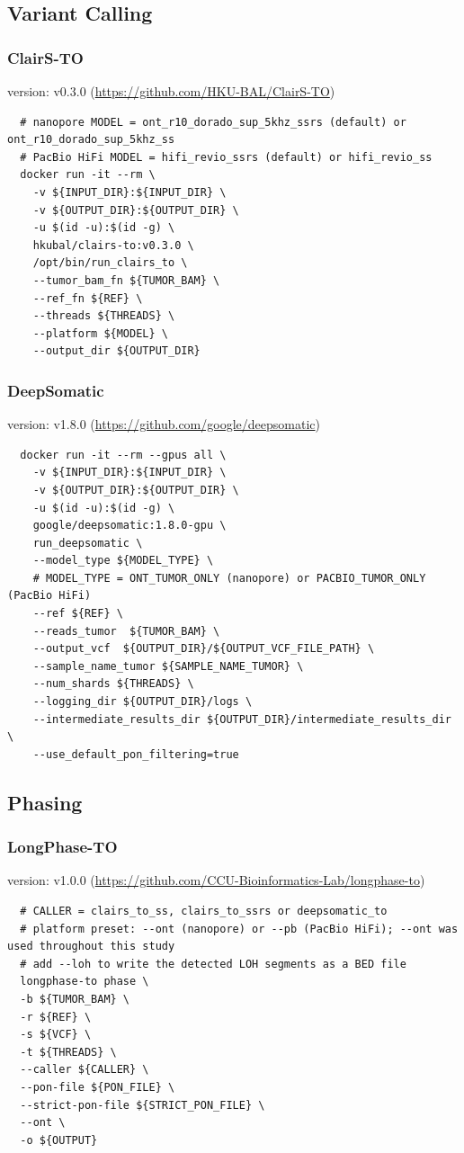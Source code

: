 \documentclass[pdflatex,sn-nature]{sn-jnl}
\begin{document}
\subsection{Variant Calling}
\subsubsection{ClairS-TO}
version: v0.3.0 (\url{https://github.com/HKU-BAL/ClairS-TO})
\label{supp:clairsto}
\begin{verbatim}
  # nanopore MODEL = ont_r10_dorado_sup_5khz_ssrs (default) or ont_r10_dorado_sup_5khz_ss
  # PacBio HiFi MODEL = hifi_revio_ssrs (default) or hifi_revio_ss
  docker run -it --rm \
    -v ${INPUT_DIR}:${INPUT_DIR} \
    -v ${OUTPUT_DIR}:${OUTPUT_DIR} \
    -u $(id -u):$(id -g) \
    hkubal/clairs-to:v0.3.0 \
    /opt/bin/run_clairs_to \
    --tumor_bam_fn ${TUMOR_BAM} \
    --ref_fn ${REF} \
    --threads ${THREADS} \
    --platform ${MODEL} \
    --output_dir ${OUTPUT_DIR}
\end{verbatim}

\subsubsection{DeepSomatic}
version: v1.8.0 (\url{https://github.com/google/deepsomatic})
\label{supp:deepsomatic}
\begin{verbatim}
  docker run -it --rm --gpus all \
    -v ${INPUT_DIR}:${INPUT_DIR} \
    -v ${OUTPUT_DIR}:${OUTPUT_DIR} \
    -u $(id -u):$(id -g) \
    google/deepsomatic:1.8.0-gpu \
    run_deepsomatic \
    --model_type ${MODEL_TYPE} \
    # MODEL_TYPE = ONT_TUMOR_ONLY (nanopore) or PACBIO_TUMOR_ONLY (PacBio HiFi)
    --ref ${REF} \
    --reads_tumor  ${TUMOR_BAM} \
    --output_vcf  ${OUTPUT_DIR}/${OUTPUT_VCF_FILE_PATH} \
    --sample_name_tumor ${SAMPLE_NAME_TUMOR} \
    --num_shards ${THREADS} \
    --logging_dir ${OUTPUT_DIR}/logs \
    --intermediate_results_dir ${OUTPUT_DIR}/intermediate_results_dir \
    --use_default_pon_filtering=true
\end{verbatim}

\subsection{Phasing}
\subsubsection{LongPhase-TO}
version: v1.0.0 (\url{https://github.com/CCU-Bioinformatics-Lab/longphase-to})
\label{supp:longphaseto}
\begin{verbatim}
  # CALLER = clairs_to_ss, clairs_to_ssrs or deepsomatic_to
  # platform preset: --ont (nanopore) or --pb (PacBio HiFi); --ont was used throughout this study
  # add --loh to write the detected LOH segments as a BED file
  longphase-to phase \
  -b ${TUMOR_BAM} \
  -r ${REF} \
  -s ${VCF} \
  -t ${THREADS} \
  --caller ${CALLER} \
  --pon-file ${PON_FILE} \
  --strict-pon-file ${STRICT_PON_FILE} \
  --ont \
  -o ${OUTPUT}
\end{verbatim}
\end{document}
